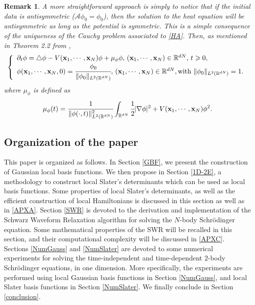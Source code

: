 \documentclass[11pt]{elsarticle}
\newtheorem{rem}{Remark}[section]
\let \geq \geqslant
\newcommand{\R} {\ensuremath{\mathbb{R}}}
\begin{document}
\begin{rem}
A more straightforward approach is simply to notice that if the initial data is antisymmetric ($\mathcal{A}\phi_0=\phi_0$), then the solution to the heat equation will be antisymmetric as long as the potential is symmetric. This is a simple consequence of the uniqueness of the Cauchy problem associated to \eqref{HA}. Then, as mentioned in Theorem 2.2 from \cite{bao},
\begin{eqnarray}\label{e1ter}
\left\{
\begin{array}{l}
\partial_t \phi =\triangle \phi - V({\bf x}_1,\cdots,{\bf x}_N)\phi + \mu_{\phi}\phi, \, ({\bf x}_1,\cdots,{\bf x}_N) \in  \R^{dN},\, t \geq 0, \\
\phi({\bf x}_1,\cdots,{\bf x}_N,0)=\cfrac{\phi_0}{\|\phi_0\|_{L^{2}(\mathbb{R}^{dN})}}, \, ({\bf x}_1,\cdots,{\bf x}_N) \in  \R^{dN}, \textrm{with $\|\phi_{0} \|_{L^{2}(\mathbb{R}^{dN})}=1$.}
\end{array}
\right.
\end{eqnarray} 
where $\mu_{\phi}$ is defined as 
\begin{eqnarray*}
\mu_{\phi}(t) = \cfrac{1}{\|\phi(\cdot,t)\|^2_{L^2(\R^{dN})}}\int_{\R^{dN}}\cfrac{1}{2}|\nabla\phi|^2+V({\bf x}_1,\cdots,{\bf x}_N)\phi^2.
\end{eqnarray*}
\end{rem}
\subsection{Organization of the paper}
This paper is organized as follows. In Section \ref{GBF}, we present the construction of Gaussian local basis functions. We then propose in Section \ref{1D-2E}, a methodology to construct local Slater's determinants which can be used as local basis functions. Some properties of local Slater's determinants, as well as the efficient construction of local Hamiltonians is discussed in this section as well as in \ref{APXA}. Section \ref{SWR} is devoted to the derivation and implementation of the Schwarz Waveform Relaxation algorithm for solving the $N$-body Schr\"odinger equation. Some mathematical properties of the SWR will be recalled in this section, and their computational complexity will be discussed in \ref{APXC}. Sections \ref{NumGauss} and \ref{NumSlater} are devoted to some numerical experiments for solving the time-independent and time-dependent $2$-body Schr\"odinger equations, in one dimension. More specifically, the experiments are performed using local Gaussian basis functions in Section \ref{NumGauss}, and local Slater basis functions in Section \ref{NumSlater}. We finally conclude in Section \ref{conclusion}.
\end{document}
